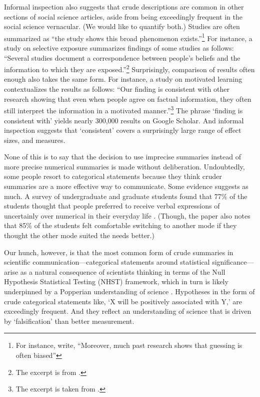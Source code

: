 \documentclass[12pt]{article}
\begin{document}
Informal inspection also suggests that crude descriptions are common in other sections of social science articles, aside from being exceedingly frequent in the social science vernacular. (We would like to quantify both.) Studies are often summarized as ``the study shows this broad phenomenon exists.''\footnote{For instance, \citet{pasek2015} write, ``Moreover, much past research shows that guessing is often biased''} For instance, a study on selective exposure summarizes findings of some studies as follows: ``Several studies document a correspondence between people's beliefs and the information to which they are exposed.''\footnote{The excerpt is from \citet{stroud2008}.} Surprisingly, comparison of results often enough also takes the same form. For instance, a study on motivated learning contextualizes the results as follows: ``Our finding is consistent with other research showing that even when people agree on factual information, they often still interpret the information in a motivated manner.''\footnote{The excerpt is taken from \citet{khanna2015}.} The phrase `finding is consistent with' yields nearly 300,000 results on Google Scholar. And informal inspection suggests that `consistent' covers a surprisingly large range of effect sizes, and measures.    

None of this is to say that the decision to use imprecise summaries instead of more precise numerical summaries is made without deliberation. Undoubtedly, some people resort to categorical statements because they think cruder summaries are a more effective way to communicate. Some evidence suggests as much. A survey of undergraduate and graduate students found that 77\% of the students thought that people preferred to receive verbal expressions of uncertainly over numerical in their everyday life \citep{wallsten1993preferences}. (Though, the paper also notes that 85\% of the students felt comfortable switching to another mode if they thought the other mode suited the needs better.) 

Our hunch, however, is that the most common form of crude summaries in scientific communication---categorical statements around statistical significance---arise as a natural consequence of scientists thinking in terms of the Null Hypothesis Statistical Testing (NHST) framework, which in turn is likely underpinned by a Popperian understanding of science \citep{gelman2013philosophy}. Hypotheses in the form of crude categorical statements like, `X will be positively associated with Y,' are exceedingly frequent. And they reflect an understanding of science that is driven by `falsification' than better measurement. 
\end{document}
